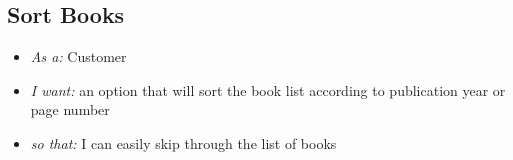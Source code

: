 \documentclass{article}
\begin{document}
\subsection{Sort Books}
\begin{itemize}
\item \emph{As a:} Customer
\item \emph{I want:}  an option that will sort the book list according to publication year or page number 
\item \emph{so that:} I can easily skip through the list of books
\end{itemize}
\end{document}
